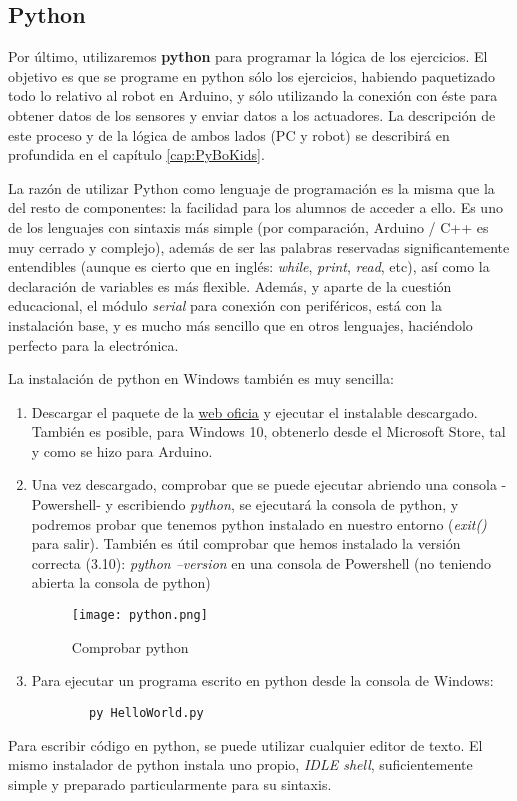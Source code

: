 \subsection{Python}\label{subsec:python}
Por último, utilizaremos \textbf{python} para programar la lógica de los ejercicios. El objetivo es que se programe en python sólo los ejercicios, habiendo paquetizado todo lo relativo al robot en Arduino, y sólo utilizando la conexión con éste para obtener datos de los sensores y enviar datos a los actuadores. La descripción de este proceso y de la lógica de ambos lados (PC y robot) se describirá en profundida en el capítulo \ref{cap:PyBoKids}.
\par La razón de utilizar Python como lenguaje de programación es la misma que la del resto de componentes: la facilidad para los alumnos de acceder a ello. Es uno de los lenguajes con sintaxis más simple (por comparación, Arduino / C++ es muy cerrado y complejo), además de ser las palabras reservadas significantemente entendibles (aunque es cierto que en inglés: \textit{while}, \textit{print}, \textit{read}, etc), así como la declaración de variables es más flexible. Además, y aparte de la cuestión educacional, el módulo \textit{serial} para conexión con periféricos, está con la instalación base, y es mucho más sencillo que en otros lenguajes, haciéndolo perfecto para la electrónica. 
\par La instalación de python en Windows también es muy sencilla:
\begin{enumerate}
	\item Descargar el paquete de la \href{https://www.python.org/downloads/}{web oficia} y ejecutar el instalable descargado.
	También es posible, para Windows 10, obtenerlo desde el Microsoft Store, tal y como se hizo para Arduino.
	\item Una vez descargado, comprobar que se puede ejecutar abriendo una consola -Powershell- y escribiendo \textit{python},	se ejecutará la consola de python, y podremos probar que tenemos python instalado en nuestro entorno (\textit{exit()} para salir). También es útil comprobar que hemos instalado la versión correcta (3.10): \textit{python --version} en una consola de Powershell (no teniendo abierta la consola de python)
	\begin{figure}[h]
		\texttt{[image: python.png]}
		\centering
		\label{img:python}
		\caption{Comprobar python}
	\end{figure}
	\item Para ejecutar un programa escrito en python desde la consola de Windows: 
	\begin{verbatim}
		py HelloWorld.py
	\end{verbatim}
\end{enumerate}
Para escribir código en python, se puede utilizar cualquier editor de texto. El mismo instalador de python instala uno propio, \textit{IDLE shell}, suficientemente simple y preparado particularmente para su sintaxis.
